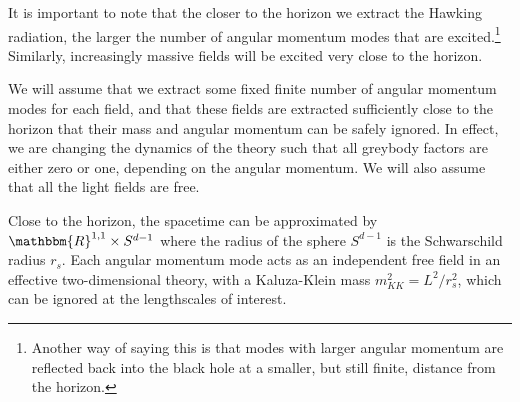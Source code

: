 \documentclass[11pt,a4paper]{article}
\begin{document}
It is important to note that the closer to the horizon we extract the Hawking radiation, the larger the number of angular momentum modes that are excited.\footnote{Another way of saying this is that modes with larger angular momentum are reflected back into the black hole at a smaller, but still finite, distance from the horizon.} Similarly, increasingly massive fields will be excited very close to the horizon. 

We will assume that we extract some fixed finite number of angular momentum modes for each field, and that these fields are extracted sufficiently close to the horizon that their mass and angular momentum can be safely ignored. In effect, we are changing the dynamics of the theory such that all greybody factors are either zero or one, depending on the angular momentum. We will also assume that all the light fields are free.

Close to the horizon, the spacetime can be approximated by $\mathbbm{R}^{1,1} \times S^{d-1}$ where the radius of the sphere $S^{d-1}$ is the Schwarschild radius $r_s$. Each angular momentum mode acts as an independent free field in an effective two-dimensional theory, with a Kaluza-Klein mass $m_{KK}^2 = L^2 / r_s^2$, which can be ignored at the lengthscales of interest.
\end{document}
